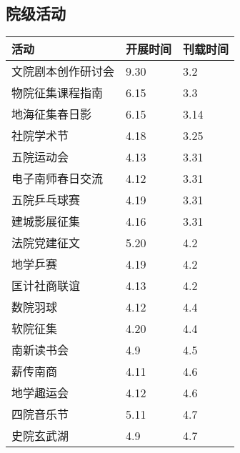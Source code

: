 \documentclass[letterpaper, 12pt]{article}
\begin{document}
\begin{multicols}{2}
\section{院级活动}
\begin{tabular}{|>{\centering\arraybackslash}m{}|m{}|m{}|}
\hline
    活动 & 开展时间 & 刊载时间\\
    \hline\hline
    文院剧本创作研讨会 & 9.30 & 3.2\\
    物院征集课程指南 & 6.15 & 3.3\\
    地海征集春日影 & 6.15 & 3.14\\
    社院学术节 & 4.18 & 3.25\\
    五院运动会 & 4.13 & 3.31\\
    电子南师春日交流 & 4.12 & 3.31\\
    五院乒乓球赛 & 4.19 & 3.31\\
    建城影展征集 & 4.16 & 3.31\\
    法院党建征文 & 5.20 & 4.2\\
    地学乒赛 & 4.19 & 4.2\\
    匡计社商联谊 & 4.13 & 4.2\\
    数院羽球 & 4.12 & 4.4\\
    软院征集 & 4.20 & 4.4\\
    南新读书会 & 4.9 & 4.5\\
    薪传南商 & 4.11 & 4.6\\
    地学趣运会 & 4.12 & 4.6\\
    四院音乐节 & 5.11 & 4.7\\
    史院玄武湖 & 4.9 & 4.7\\
    \hline
\end{tabular}


\end{multicols}
\end{document}
